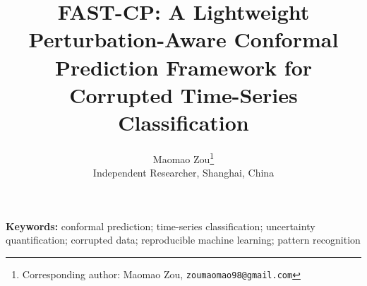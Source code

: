 \documentclass[11pt]{article}
\title{FAST-CP: A Lightweight Perturbation-Aware Conformal Prediction Framework for Corrupted Time-Series Classification}
\author{
Maomao Zou\thanks{Corresponding author: Maomao Zou, \texttt{zoumaomao98@gmail.com}}\\
Independent Researcher, Shanghai, China
}
\date{}
\begin{document}
\maketitle

\begin{abstract}

\end{abstract}

\noindent\textbf{Keywords:} conformal prediction; time-series classification; uncertainty quantification; corrupted data; reproducible machine learning; pattern recognition












\appendix

\end{document}
